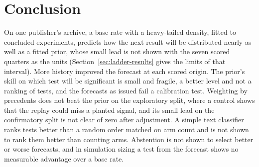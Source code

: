 \section{Conclusion}
\label{sec:conclusion}
On one publisher's archive, a base rate with a heavy-tailed density, fitted to concluded experiments, predicts how the next result will be distributed nearly as well as a fitted prior, whose small lead is not shown with the seven scored quarters as the units (Section~\ref{sec:ladder-results} gives the limits of that interval). More history improved the forecast at each scored origin. The prior's skill on which test will be significant is small and fragile, a better level and not a ranking of tests, and the forecasts as issued fail a calibration test. Weighting by precedents does not beat the prior on the exploratory split, where a control shows that the replay could miss a planted signal, and its small lead on the confirmatory split is not clear of zero after adjustment. A simple text classifier ranks tests better than a random order matched on arm count and is not shown to rank them better than counting arms. Abstention is not shown to select better or worse forecasts, and in simulation sizing a test from the forecast shows no measurable advantage over a base rate.

